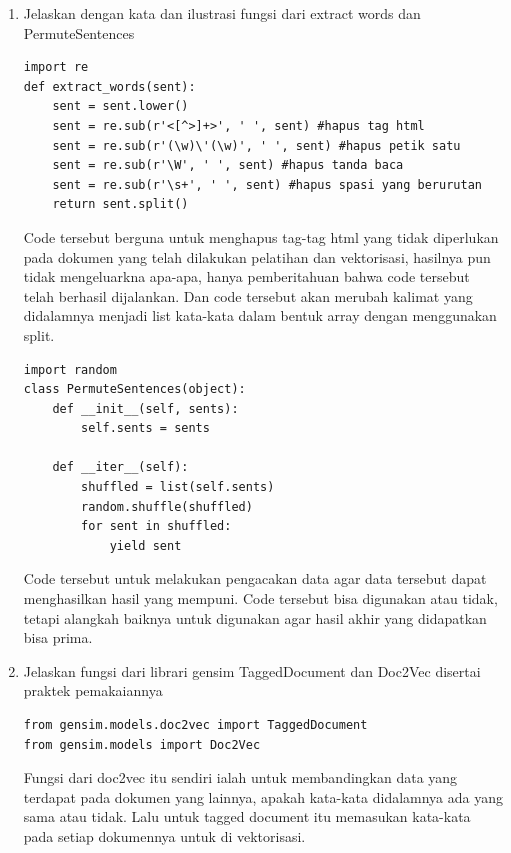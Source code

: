 \begin{enumerate}
\item Jelaskan dengan kata dan ilustrasi fungsi dari extract words dan PermuteSentences
\begin{verbatim}
import re
def extract_words(sent):
    sent = sent.lower()
    sent = re.sub(r'<[^>]+>', ' ', sent) #hapus tag html
    sent = re.sub(r'(\w)\'(\w)', ' ', sent) #hapus petik satu
    sent = re.sub(r'\W', ' ', sent) #hapus tanda baca
    sent = re.sub(r'\s+', ' ', sent) #hapus spasi yang berurutan
    return sent.split()
\end{verbatim}
Code tersebut berguna untuk menghapus tag-tag html yang tidak diperlukan pada dokumen yang telah dilakukan pelatihan dan vektorisasi, hasilnya pun tidak mengeluarkna apa-apa, hanya pemberitahuan bahwa code tersebut telah berhasil dijalankan. Dan code tersebut akan merubah kalimat yang didalamnya menjadi list kata-kata dalam bentuk array dengan menggunakan split.

\begin{verbatim}
import random
class PermuteSentences(object):
    def __init__(self, sents):
        self.sents = sents
        
    def __iter__(self):
        shuffled = list(self.sents)
        random.shuffle(shuffled)
        for sent in shuffled:
            yield sent
\end{verbatim}
Code tersebut untuk melakukan pengacakan data agar data tersebut dapat menghasilkan hasil yang mempuni. Code tersebut bisa digunakan atau tidak, tetapi alangkah baiknya untuk digunakan agar hasil akhir yang didapatkan bisa prima.

\item Jelaskan fungsi dari librari gensim TaggedDocument dan Doc2Vec disertai praktek pemakaiannya
\begin{verbatim}
from gensim.models.doc2vec import TaggedDocument
from gensim.models import Doc2Vec
\end{verbatim}
Fungsi dari doc2vec itu sendiri ialah untuk membandingkan data yang terdapat pada dokumen yang lainnya, apakah kata-kata didalamnya ada yang sama atau tidak. Lalu untuk tagged document itu memasukan kata-kata pada setiap dokumennya untuk di vektorisasi.
\end{enumerate}